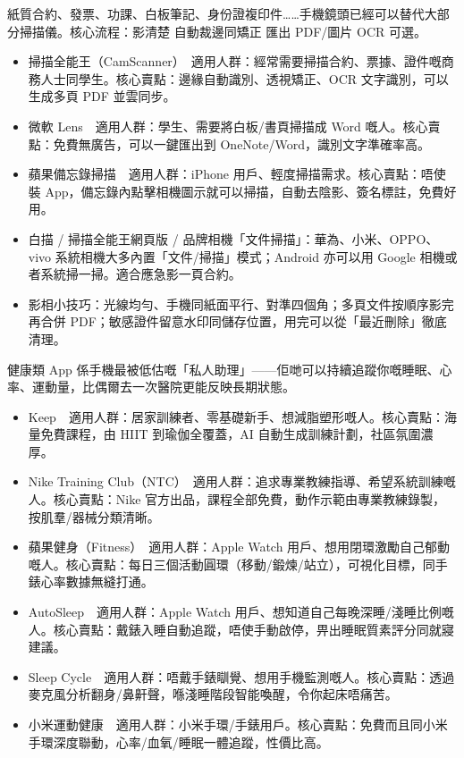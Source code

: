 紙質合約、發票、功課、白板筆記、身份證複印件……手機鏡頭已經可以替代大部分掃描儀。核心流程：影清楚 自動裁邊同矯正 匯出 PDF/圖片 OCR 可選。

\begin{itemize}
  \item 掃描全能王（CamScanner）　適用人群：經常需要掃描合約、票據、證件嘅商務人士同學生。核心賣點：邊緣自動識別、透視矯正、OCR 文字識別，可以生成多頁 PDF 並雲同步。
  \item 微軟 Lens　適用人群：學生、需要將白板/書頁掃描成 Word 嘅人。核心賣點：免費無廣告，可以一鍵匯出到 OneNote/Word，識別文字準確率高。
  \item 蘋果備忘錄掃描　適用人群：iPhone 用戶、輕度掃描需求。核心賣點：唔使裝 App，備忘錄內點擊相機圖示就可以掃描，自動去陰影、簽名標註，免費好用。
  \item 白描 / 掃描全能王網頁版 / 品牌相機「文件掃描」：華為、小米、OPPO、vivo 系統相機大多內置「文件/掃描」模式；Android 亦可以用 Google 相機或者系統掃一掃。適合應急影一頁合約。
  \item 影相小技巧：光線均勻、手機同紙面平行、對準四個角；多頁文件按順序影完再合併 PDF；敏感證件留意水印同儲存位置，用完可以從「最近刪除」徹底清理。
\end{itemize}


健康類 App 係手機最被低估嘅「私人助理」——佢哋可以持續追蹤你嘅睡眠、心率、運動量，比偶爾去一次醫院更能反映長期狀態。


\begin{itemize}
  \item Keep　適用人群：居家訓練者、零基礎新手、想減脂塑形嘅人。核心賣點：海量免費課程，由 HIIT 到瑜伽全覆蓋，AI 自動生成訓練計劃，社區氛圍濃厚。
  \item Nike Training Club（NTC）　適用人群：追求專業教練指導、希望系統訓練嘅人。核心賣點：Nike 官方出品，課程全部免費，動作示範由專業教練錄製，按肌羣/器械分類清晰。
  \item 蘋果健身（Fitness）　適用人群：Apple Watch 用戶、想用閉環激勵自己郁動嘅人。核心賣點：每日三個活動圓環（移動/鍛煉/站立），可視化目標，同手錶心率數據無縫打通。
\end{itemize}


\begin{itemize}
  \item AutoSleep　適用人群：Apple Watch 用戶、想知道自己每晚深睡/淺睡比例嘅人。核心賣點：戴錶入睡自動追蹤，唔使手動啟停，畀出睡眠質素評分同就寢建議。
  \item Sleep Cycle　適用人群：唔戴手錶瞓覺、想用手機監測嘅人。核心賣點：透過麥克風分析翻身/鼻鼾聲，喺淺睡階段智能喚醒，令你起床唔痛苦。
  \item 小米運動健康　適用人群：小米手環/手錶用戶。核心賣點：免費而且同小米手環深度聯動，心率/血氧/睡眠一體追蹤，性價比高。
\end{itemize}

